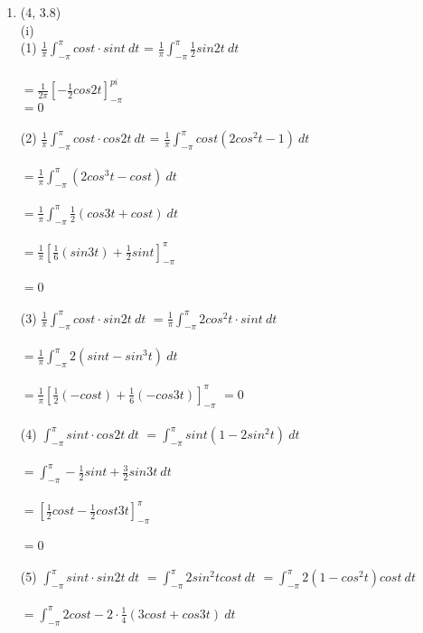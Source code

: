 \documentclass[letterpaper,12pt]{article}
\theoremstyle{definition}
\begin{document}
\begin{enumerate}
	\item (4, 3.8) \\
(i)
\\
(1)
$\frac{1}{\pi}\int_{-\pi}^{\pi} cost \cdot sint \ dt $ = $\frac{1}{\pi}\int_{-\pi}^{\pi} \frac{1}{2} sin2t \ dt $ 
\\
\\
$=\frac{1}{2\pi}[-\frac{1}{2} cos2t]_{-\pi}^{pi}$
\\
$=0$
\\
\\
(2)
$\frac{1}{\pi}\int_{-\pi}^{\pi} cost \cdot cos2t \ dt $ = $\frac{1}{\pi}\int_{-\pi}^{\pi} cost (2cos^2t-1) \ dt $
\\
\\
$=\frac{1}{\pi}\int_{-\pi}^{\pi} (2cos^3t-cost) \ dt $
\\
\\
$=\frac{1}{\pi}\int_{-\pi}^{\pi} \frac{1}{2}(cos3t+cost) \ dt $
\\
\\
$=\frac{1}{\pi}[\frac{1}{6}(sin3t)+\frac{1}{2}sint]_{-\pi}^{\pi} $
\\
\\
$=0$
\\
\\
(3)
$\frac{1}{\pi}\int_{-\pi}^{\pi} cost \cdot sin2t \ dt $ 
$=\frac{1}{\pi}\int_{-\pi}^{\pi} 2cos^2t \cdot sint \ dt $ 
\\
\\
$=\frac{1}{\pi}\int_{-\pi}^{\pi} 2(sint - sin^3t) \ dt $ 
\\
\\
$=\frac{1}{\pi}[\frac{1}{2}(-cost)+\frac{1}{6}(-cos3t)]_{-\pi}^{\pi} $ 
$=0$
\\
\\
(4)
$\int_{-\pi}^{\pi} sint \cdot cos2t \ dt $ 
$=\int_{-\pi}^{\pi} sint(1-2sin^2t) \ dt $ 
\\
\\
$=\int_{-\pi}^{\pi} -\frac{1}{2}sint + \frac{3}{2}sin3t \ dt $ 
\\
\\
$=[\frac{1}{2}cost - \frac{1}{2}cost3t]_{-\pi}^{\pi} $
\\
\\
$=0$
\\
\\
(5)
$\int_{-\pi}^{\pi} sint \cdot sin2t \ dt $ 
$=\int_{-\pi}^{\pi} 2sin^2t cost \ dt $ 
$=\int_{-\pi}^{\pi} 2(1-cos^2t)cost \ dt $ 
\\
\\
$=\int_{-\pi}^{\pi} 2cost - 2 \cdot \frac{1}{4}(3cost + cos3t) \ dt $ 

\end{enumerate}
\end{document}
